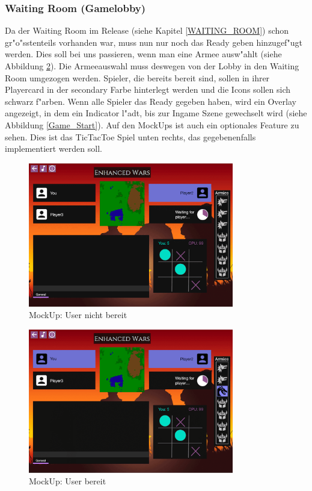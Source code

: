 \documentclass[12pt, titlepage]{scrartcl}
\newcommand{\RN}[1]{%
	\textup{\uppercase\expandafter{\romannumeral#1}}%
}
\begin{document}
		    \subsubsection{Waiting Room (Gamelobby)}
		        Da der Waiting Room im Release \RN{2} (siehe Kapitel \ref{WAITING_ROOM}) schon gr"o"sstenteils vorhanden war, muss nun nur noch das Ready geben hinzugef"ugt werden. Dies soll bei uns passieren, wenn man eine Armee ausw"ahlt (siehe Abbildung \ref{Ready}). Die Armeeauswahl muss deswegen von der Lobby in den Waiting Room umgezogen werden. Spieler, die bereits bereit sind, sollen in ihrer Playercard in der secondary Farbe hinterlegt werden und die Icons sollen sich schwarz f"arben. Wenn alle Spieler das Ready gegeben haben, wird ein Overlay angezeigt, in dem ein Indicator l"adt, bis zur Ingame Szene gewechselt wird (siehe Abbildung \ref{Game_Start}). Auf den MockUps ist auch ein optionales Feature zu sehen. Dies ist das TicTacToe Spiel unten rechts, das gegebenenfalls implementiert werden soll. \\
		        \begin{figure}[H] 
    				\centering
    				\includegraphics[width=0.8\textwidth]{images/mockUps/NotReady.png}
    				\caption{MockUp: User nicht bereit}
    				\label{Not_Ready}
			    \end{figure}
			    \begin{figure}[H] 
    				\centering
    				\includegraphics[width=0.8\textwidth]{images/mockUps/Ready.png}
    				\caption{MockUp: User bereit}
    				\label{Ready}
			    \end{figure}
\end{document}
